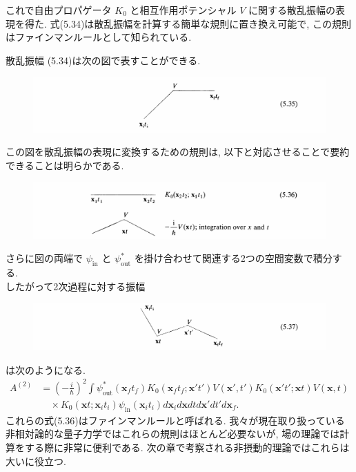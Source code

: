 \documentclass[a4paper,12pt]{article}
\begin{document}
これで自由プロパゲータ $K_0$ と相互作用ポテンシャル $V$ に関する散乱振幅の表現を得た. 式(5.34)は散乱振幅を計算する簡単な規則に置き換え可能で, この規則はファインマンルールとして知られている.\par
散乱振幅 (5.34)は次の図で表すことができる.
\begin{figure}[H]
    \centering\includegraphics[width=\textwidth]{figure/eq5-35.png}
\end{figure}
この図を散乱振幅の表現に変換するための規則は, 以下と対応させることで要約できることは明らかである.
\begin{figure}[H]
    \centering\includegraphics[width=\textwidth]{figure/eq5-36.png}
\end{figure}
さらに図の両端で $\psi_{\textrm{in}}$ と $\psi_{\textrm{out}}^{*}$ を掛け合わせて関連する2つの空間変数で積分する.\\
したがって2次過程に対する振幅
\begin{figure}[H]
    \centering\includegraphics[width=\textwidth]{figure/eq5-37.png}
\end{figure}
は次のようになる.
\begin{align*}
    A^{(2)} &= \left( -\frac{i}{\hbar} \right)^2 \int \psi_{\textrm{out}}^{*}(\mathbf{x}_f t_f) K_0(\mathbf{x}_f t_f; \mathbf{x}'t') V(\mathbf{x}',t')K_0(\mathbf{x}'t'; \mathbf{x}t) V(\mathbf{x},t)\\
    & \quad \times  K_0(\mathbf{x}t; \mathbf{x}_i t_i) \psi_{\textrm{in}}(\mathbf{x}_i t_i) d\mathbf{x}_i d\mathbf{x} dt d\mathbf{x}' dt' d\mathbf{x}_f.
    \end{align*}
    これらの式(5.36)はファインマンルールと呼ばれる. 我々が現在取り扱っている非相対論的な量子力学ではこれらの規則はほとんど必要ないが, 場の理論では計算をする際に非常に便利である. 次の章で考察される非摂動的理論ではこれらは大いに役立つ.\par
\end{document}
